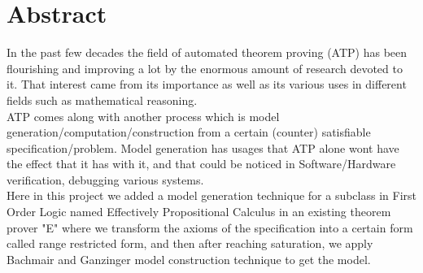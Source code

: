 \chapter*{Abstract}
\label{chap:abstract}

In the past few decades the field of automated theorem proving (ATP) has been flourishing and improving a lot by the enormous amount of research devoted to it. That interest came from its importance as well as its various uses in different fields such as mathematical reasoning.
\\
ATP comes along with another process which is model generation/computation/construction from a certain (counter) satisfiable specification/problem. Model generation has usages that ATP alone wont have the effect that it has with it, and that could be noticed in Software/Hardware verification, debugging various systems.
\\
Here in this project we added a model generation technique for a subclass in First Order Logic named Effectively Propositional Calculus in an existing theorem prover "E" where we transform the axioms of the specification into a certain form called range restricted form, and then after reaching saturation, we apply Bachmair and Ganzinger model construction technique to get the model.